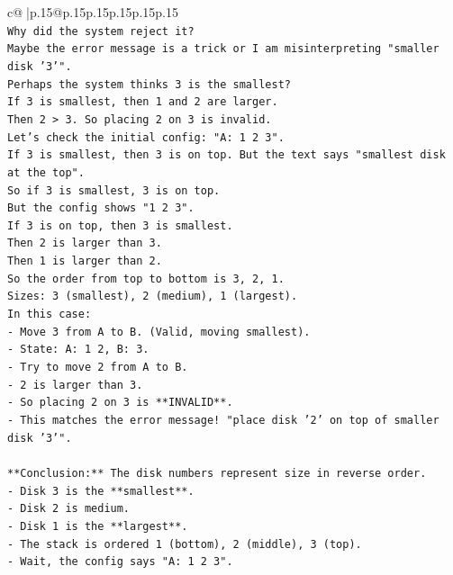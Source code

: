 \documentclass{article}
\begin{document}
{\begin{supertabular}{c@{$\;$}|p{.15\linewidth}@{}p{.15\linewidth}p{.15\linewidth}p{.15\linewidth}p{.15\linewidth}p{.15\linewidth}}
{{{\\ 
\texttt{Why did the system reject it?} \\
\texttt{Maybe the error message is a trick or I am misinterpreting "smaller disk '3'".} \\
\texttt{Perhaps the system thinks 3 is the smallest?} \\
\texttt{If 3 is smallest, then 1 and 2 are larger.} \\
\texttt{Then 2 > 3. So placing 2 on 3 is invalid.} \\
\texttt{Let's check the initial config: "A: 1 2 3".} \\
\texttt{If 3 is smallest, then 3 is on top. But the text says "smallest disk at the top".} \\
\texttt{So if 3 is smallest, 3 is on top.} \\
\texttt{But the config shows "1 2 3".} \\
\texttt{If 3 is on top, then 3 is smallest.} \\
\texttt{Then 2 is larger than 3.} \\
\texttt{Then 1 is larger than 2.} \\
\texttt{So the order from top to bottom is 3, 2, 1.} \\
\texttt{Sizes: 3 (smallest), 2 (medium), 1 (largest).} \\
\texttt{In this case:} \\
\texttt{{-} Move 3 from A to B. (Valid, moving smallest).} \\
\texttt{{-} State: A: 1 2, B: 3.} \\
\texttt{{-} Try to move 2 from A to B.} \\
\texttt{{-} 2 is larger than 3.} \\
\texttt{{-} So placing 2 on 3 is **INVALID**.} \\
\texttt{{-} This matches the error message! "place disk '2' on top of smaller disk '3'".} \\
\\ 
\texttt{**Conclusion:** The disk numbers represent size in reverse order.} \\
\texttt{{-} Disk 3 is the **smallest**.} \\
\texttt{{-} Disk 2 is medium.} \\
\texttt{{-} Disk 1 is the **largest**.} \\
\texttt{{-} The stack is ordered 1 (bottom), 2 (middle), 3 (top).} \\
\texttt{{-} Wait, the config says "A: 1 2 3".} \\
}}}
\end{supertabular}}
\end{document}
